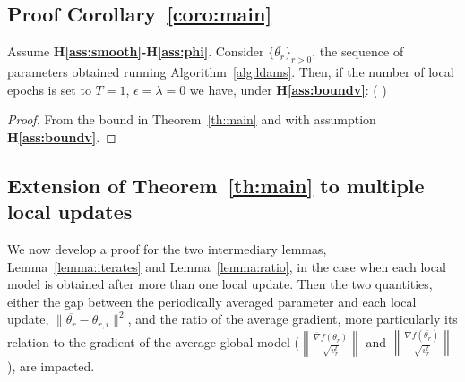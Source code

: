 \documentclass{article}
\begin{document}
\subsection{Proof Corollary~\ref{coro:main}}

\begin{Corollary*}
Assume \textbf{H\ref{ass:smooth}-H\ref{ass:phi}}. Consider $\{\overline{\theta_r}\}_{r>0}$, the sequence of parameters obtained running Algorithm~\ref{alg:ldams}. Then, if the number of local epochs is set to $T=1$, $\epsilon = \lambda = 0$ we have, under \textbf{H\ref{ass:boundv}}:
\beq \notag
{} \EE{} \leq {}\left(  \right)
\eeq
\end{Corollary*}

\begin{proof}
From the bound in Theorem~\ref{th:main} and with assumption \textbf{H\ref{ass:boundv}}.
\end{proof}





\subsection{Extension of Theorem~\ref{th:main} to multiple local updates}\label{app:multiple}

We now develop a proof for the two intermediary lemmas, Lemma~\ref{lemma:iterates} and Lemma~\ref{lemma:ratio}, in the case when each local model is obtained after more than one local update.
Then the two quantities, either the gap between the periodically averaged parameter and each local update, \ie $\| \overline{\theta_r} - \theta_{r,i} \|^2$, and the ratio of the average gradient, more particularly its relation to the gradient of the average global model (\ie $\left\| \frac{\overline{\nabla}f(\theta_r)}{\sqrt{ v_r^t}} \right\|$ and $ \left\| \frac{\nabla f(\overline{\theta_r})}{\sqrt{ v_r^t}} \right\| $), are impacted.
\end{document}
